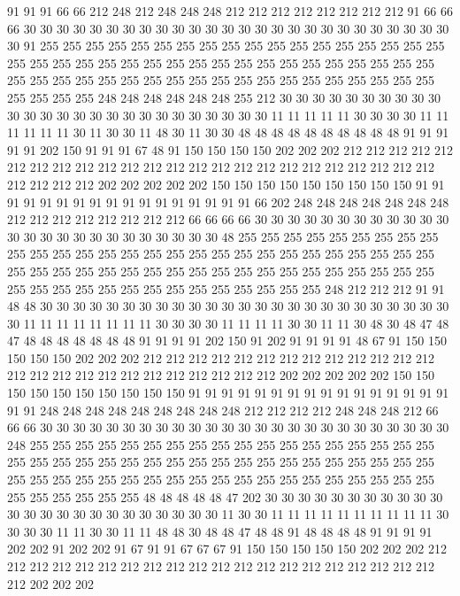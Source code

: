 91 91 91 66 66 212 248 212 248 248 248 212 212 212 212 212 212 212 212 91
66 66 66 30 30 30 30 30 30 30 30 30 30 30 30 30 30 30 30 30
30 30 30 30 30 30 30 30 30 30 91 255 255 255 255 255 255 255 255 255
255 255 255 255 255 255 255 255 255 255 255 255 255 255 255 255 255 255 255 255
255 255 255 255 255 255 255 255 255 255 255 255 255 255 255 255 255 255 255 255
255 255 255 255 255 255 255 255 255 255 255 248 248 248 248 248 248 255 212 30
30 30 30 30 30 30 30 30 30 30 30 30 30 30 30 30 30 30 30 30
30 30 30 30 30 11 11 11 11 11 30 30 30 30 11 11 11 11 11 11
30 11 30 30 11 48 30 11 30 30 48 48 48 48 48 48 48 48 48 48
91 91 91 91 91 202 150 91 91 91 67 48 91 150 150 150 150 202 202 202
212 212 212 212 212 212 212 212 212 212 212 212 212 212 212 212 212 212 212 212
212 212 212 212 212 212 212 212 202 202 202 202 202 150 150 150 150 150 150 150
150 150 91 91 91 91 91 91 91 91 91 91 91 91 91 91 91 91 91 66
202 248 248 248 248 248 248 248 212 212 212 212 212 212 212 212 66 66 66 66
30 30 30 30 30 30 30 30 30 30 30 30 30 30 30 30 30 30 30 30
30 30 30 30 30 48 255 255 255 255 255 255 255 255 255 255 255 255 255 255
255 255 255 255 255 255 255 255 255 255 255 255 255 255 255 255 255 255 255 255
255 255 255 255 255 255 255 255 255 255 255 255 255 255 255 255 255 255 255 255
255 255 255 255 255 255 255 248 212 212 212 91 91 48 48 30 30 30 30 30
30 30 30 30 30 30 30 30 30 30 30 30 30 30 30 30 30 30 30 30
30 11 11 11 11 11 11 11 11 30 30 30 30 11 11 11 11 30 30 11
11 30 48 30 48 47 48 47 48 48 48 48 48 48 48 91 91 91 91 202
150 91 202 91 91 91 91 48 67 91 150 150 150 150 150 202 202 202 212 212
212 212 212 212 212 212 212 212 212 212 212 212 212 212 212 212 212 212 212 212
212 212 212 202 202 202 202 202 150 150 150 150 150 150 150 150 150 150 91 91
91 91 91 91 91 91 91 91 91 91 91 91 91 91 91 91 248 248 248 248
248 248 248 248 248 212 212 212 212 248 248 248 212 66 66 66 30 30 30 30
30 30 30 30 30 30 30 30 30 30 30 30 30 30 30 30 30 30 30 30
30 248 255 255 255 255 255 255 255 255 255 255 255 255 255 255 255 255 255 255
255 255 255 255 255 255 255 255 255 255 255 255 255 255 255 255 255 255 255 255
255 255 255 255 255 255 255 255 255 255 255 255 255 255 255 255 255 255 255 255
255 255 255 255 48 48 48 48 48 47 202 30 30 30 30 30 30 30 30 30
30 30 30 30 30 30 30 30 30 30 30 30 30 30 30 11 30 30 11 11
11 11 11 11 11 11 11 11 30 30 30 30 11 11 30 30 11 11 48 48
30 48 48 47 48 48 91 48 48 48 48 91 91 91 91 202 202 91 202 202
91 67 91 91 67 67 67 91 150 150 150 150 150 202 202 202 212 212 212 212
212 212 212 212 212 212 212 212 212 212 212 212 212 212 212 212 212 202 202 202
